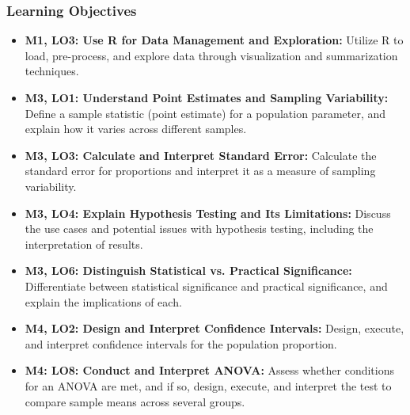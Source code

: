 \begin{frame}
    \frametitle{Learning Objectives}
    \begin{itemize}
        \item \textbf{M1, LO3: Use R for Data Management and Exploration:} Utilize R to load, pre-process, and explore data through visualization and summarization techniques.
        \item \textbf{M3, LO1: Understand Point Estimates and Sampling Variability:} Define a sample statistic (point estimate) for a population parameter, and explain how it varies across different samples.
        \item \textbf{M3, LO3: Calculate and Interpret Standard Error:} Calculate the standard error for proportions and interpret it as a measure of sampling variability.
        \item \textbf{M3, LO4: Explain Hypothesis Testing and Its Limitations:} Discuss the use cases and potential issues with hypothesis testing, including the interpretation of results.
        \item \textbf{M3, LO6: Distinguish Statistical vs. Practical Significance:} Differentiate between statistical significance and practical significance, and explain the implications of each.
        \item \textbf{M4, LO2: Design and Interpret Confidence Intervals:} Design, execute, and interpret confidence intervals for the population proportion.
        \item \textbf{M4: LO8: Conduct and Interpret ANOVA:} Assess whether conditions for an ANOVA are met, and if so, design, execute, and interpret the test to compare sample means across several groups.
    \end{itemize}
\end{frame}
    

